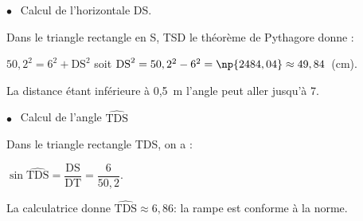 \documentclass[10pt]{article}
\begin{document}
%
%
%
%
%
%
%
%
$\bullet~~$ Calcul de l'horizontale DS.

Dans le triangle rectangle en S, TSD le théorème de Pythagore donne :

$50,2^2 = 6^2 + \text{DS}^2$ soit  $\text{DS}^2 = 50,2^2 - 6^2 = \np{2484,04} \approx 49,84$~(cm).

La distance étant inférieure à 0,5~m l'angle peut aller jusqu'à 7\degres.

$\bullet~~$ Calcul de l'angle $\widehat{\text{TDS}}$

Dans le triangle rectangle TDS, on a :

$\sin \widehat{\text{TDS}} = \dfrac{\text{DS}}{\text{DT}} = \dfrac{6}{50,2}$.

La calculatrice donne $\widehat{\text{TDS}} \approx 6,86$\degres : la rampe est conforme à la norme. 
\end{document}
